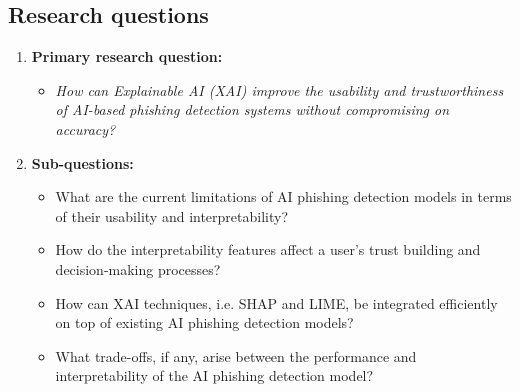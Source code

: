 \subsection*{Research questions}

\begin{enumerate}
    \item \textbf{Primary research question:}
        \begin{itemize}
            \item \textit{How can Explainable AI (XAI) improve the usability and trustworthiness of AI-based phishing detection systems without compromising on accuracy?}
        \end{itemize}
    \item \textbf{Sub-questions:}
        \begin{itemize}
            \item What are the current limitations of AI phishing detection models in terms of their usability and interpretability?
            \item How do the interpretability features affect a user's trust building and decision-making processes?
            \item How can XAI techniques, i.e. SHAP and LIME, be integrated efficiently on top of existing AI phishing detection models?
            \item What trade-offs, if any, arise between the performance and interpretability of the AI phishing detection model?
        \end{itemize}
\end{enumerate}
